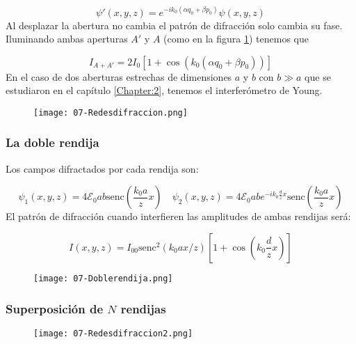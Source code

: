 \documentclass[12pt,a4paper]{book}
\numberwithin{equation}{section}
\numberwithin{figure}{section}
\newcommand{\parentesis}[1]{\left( #1  \right)}
\newcommand{\ccorchetes}[1]{\left[ #1  \right]}
\newcommand{\1}{_{(1)}}
\newcommand{\2}{_{(2)}}
\newcommand{\sinc}{\mathrm{senc} }
\newcommand{\Ecal}{\mathcal{E}}
\theoremstyle{definition}
\begin{document}
\begin{equation}
    \psi ' (x,y,z) = e^{-ik_0 (\alpha q_0 + \beta p_0)} \psi (x,y,z)
\end{equation}
Al desplazar la abertura no cambia el patrón de difracción solo cambia su fase. Iluminando ambas aperturas $A'$ y $A$ (como en la figura \ref{Fig:07.4-01}) tenemos que 

\begin{equation}
    I_{A+A'} = 2 I_0 \ccorchetes{1+\cos (k_0(\alpha q_0 + \beta p_0))}
\end{equation}
En el caso de dos aberturas estrechas de dimensiones $a$ y $b$ con $b\gg a$ que se estudiaron en el capítulo \ref{Chapter:2}, tenemos el interferómetro de Young. 


\begin{figure}[h!]
    \centering
    \texttt{[image: 07-Redesdifraccion.png]}
    \caption{}
    \label{Fig:07.4-01}
\end{figure}

\subsubsection{La doble rendija}
Los campos difractados por cada rendija son:

\begin{equation}
    \psi_1(x,y,z) = 4 \Ecal_0 ab \sinc \parentesis{\frac{k_0a}{z}x} \quad 
    \psi_2(x,y,z) = 4 \Ecal_0 ab e^{-ik_0 \frac{d}{z}x} \sinc \parentesis{\frac{k_0a}{z}x}
\end{equation}
El patrón de difracción cuando interfieren las amplitudes de ambas rendijas será:

\begin{equation}
I(x,y,z) = I_{00} \sinc^2(k_0ax/z) \ccorchetes{1+\cos\parentesis{k_0 \frac{d}{z}x}}    
\end{equation}

\begin{figure}[h!]
    \centering
    \texttt{[image: 07-Doblerendija.png]}
    \caption{}
    \label{Fig:07.4-02}
\end{figure}



\subsubsection{Superposición de $N$ rendijas}

\begin{figure}[h!]
    \centering
    \texttt{[image: 07-Redesdifraccion2.png]}
    \caption{}
    \label{Fig:07.4-03}
\end{figure}
\end{document}
